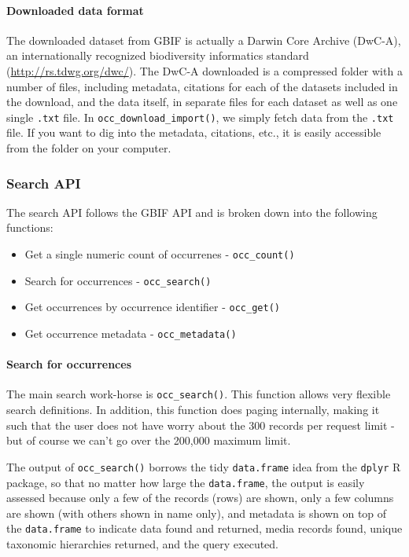 \documentclass[author-year, review, 11pt]{components/elsarticle} %
\begin{document}
\paragraph{Downloaded data format}\label{downloaded-data-format}

The downloaded dataset from GBIF is actually a Darwin Core Archive
(DwC-A), an internationally recognized biodiversity informatics standard
(\url{http://rs.tdwg.org/dwc/}). The DwC-A downloaded is a compressed
folder with a number of files, including metadata, citations for each of
the datasets included in the download, and the data itself, in separate
files for each dataset as well as one single \texttt{.txt} file. In
\texttt{occ\_download\_import()}, we simply fetch data from the
\texttt{.txt} file. If you want to dig into the metadata, citations,
etc., it is easily accessible from the folder on your computer.

\subsubsection{Search API}\label{search-api}

The search API follows the GBIF API and is broken down into the
following functions:

\begin{itemize}
\itemsep1pt\parskip0pt
\item
  Get a single numeric count of occurrenes - \texttt{occ\_count()}
\item
  Search for occurrences - \texttt{occ\_search()}
\item
  Get occurrences by occurrence identifier - \texttt{occ\_get()}
\item
  Get occurrence metadata - \texttt{occ\_metadata()}
\end{itemize}

\paragraph{Search for occurrences}\label{search-for-occurrences}

The main search work-horse is \texttt{occ\_search()}. This function
allows very flexible search definitions. In addition, this function does
paging internally, making it such that the user does not have worry
about the 300 records per request limit - but of course we can't go over
the 200,000 maximum limit.

The output of \texttt{occ\_search()} borrows the tidy
\texttt{data.frame} idea from the \texttt{dplyr} R package, so that no
matter how large the \texttt{data.frame}, the output is easily assessed
because only a few of the records (rows) are shown, only a few columns
are shown (with others shown in name only), and metadata is shown on top
of the \texttt{data.frame} to indicate data found and returned, media
records found, unique taxonomic hierarchies returned, and the query
executed.
\end{document}
